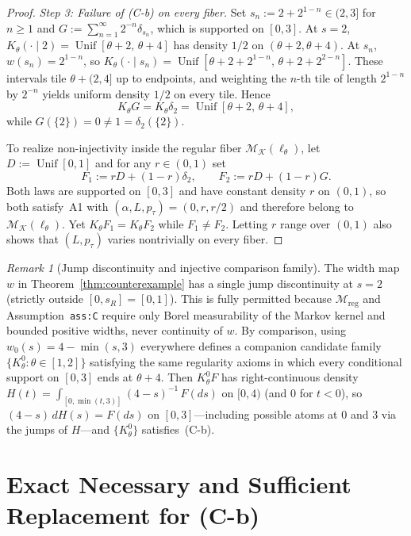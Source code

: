 \documentclass[11pt]{article}
\theoremstyle{plain}
\theoremstyle{definition}
\theoremstyle{remark}
\newtheorem{remark}{Remark}
\DeclareMathOperator{\Unif}{Unif}
\newcommand{\Mreg}{\mathcal{M}_{\mathrm{reg}}}
\begin{document}
\begin{proof}
\emph{Step 3: Failure of \textup{(C-b)} on every fiber.}
Set $s_n := 2 + 2^{1 - n} \in (2, 3]$ for $n \ge 1$ and $G := \sum_{n=1}^\infty 2^{-n}\delta_{s_n}$, which is supported on $[0, 3]$.
At $s = 2$, $K_\theta(\cdot \mid 2) = \Unif[\theta + 2,\, \theta + 4]$ has density $1/2$ on $(\theta + 2, \theta + 4)$.
At $s_n$, $w(s_n) = 2^{1 - n}$, so $K_\theta(\cdot \mid s_n) = \Unif[\theta + 2 + 2^{1 - n},\, \theta + 2 + 2^{2 - n}]$.
These intervals tile $\theta + (2, 4]$ up to endpoints, and weighting the $n$-th tile of length $2^{1 - n}$ by $2^{-n}$ yields uniform density $1/2$ on every tile. Hence
\[
K_\theta G = K_\theta \delta_2 = \Unif[\theta + 2,\, \theta + 4],
\]
while $G(\{2\}) = 0 \neq 1 = \delta_2(\{2\})$.

To realize non-injectivity inside the regular fiber $\mathcal{M}_{\mathcal{K}}(\ell_\theta)$, let $D := \Unif[0, 1]$ and for any $r \in (0, 1)$ set
\[
F_1 := r D + (1 - r)\delta_2, \qquad F_2 := r D + (1 - r)G.
\]
Both laws are supported on $[0, 3]$ and have constant density $r$ on $(0, 1)$, so both satisfy~A1 with $(\alpha, L, p_\tau) = (0, r, r/2)$ and therefore belong to $\mathcal{M}_{\mathcal{K}}(\ell_\theta)$. Yet $K_\theta F_1 = K_\theta F_2$ while $F_1 \neq F_2$. Letting $r$ range over $(0, 1)$ also shows that $(L, p_\tau)$ varies nontrivially on every fiber.
\end{proof}

\begin{remark}[Jump discontinuity and injective comparison family]
The width map $w$ in Theorem~\ref{thm:counterexample} has a single jump discontinuity at $s = 2$ (strictly outside $[0, s_R] = [0, 1]$). This is fully permitted because $\Mreg$ and Assumption~\texttt{ass:C} require only Borel measurability of the Markov kernel and bounded positive widths, never continuity of $w$.
By comparison, using $w_0(s) = 4 - \min(s, 3)$ everywhere defines a companion candidate family $\{K_\theta^0 : \theta \in [1, 2]\}$ satisfying the same regularity axioms in which every conditional support on $[0, 3]$ ends at $\theta + 4$. Then $K_\theta^0 F$ has right-continuous density $H(t) = \int_{[0, \min(t, 3)]} (4 - s)^{-1}\,F(ds)$ on $[0, 4)$ (and $0$ for $t < 0$), so $(4 - s)\,dH(s) = F(ds)$ on $[0, 3]$---including possible atoms at $0$ and $3$ via the jumps of $H$---and $\{K_\theta^0\}$ satisfies~\textup{(C-b)}.
\end{remark}

\section{Exact Necessary and Sufficient Replacement for (C-b)}
\end{document}
